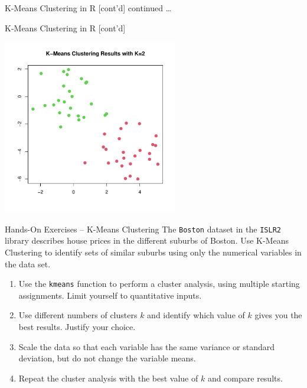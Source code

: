 \documentclass[ignorenonframetext,xcolor=x11names]{beamer}
\begin{document}
\begin{frame}[fragile]{K-Means Clustering in R \small [cont'd]}
continued \ldots
{}
\end{frame}

\begin{frame}{K-Means Clustering in R \small [cont'd]}
\centering

\includegraphics[height=3in]{kmeans.pdf}
\end{frame}

\begin{frame}{Hands-On Exercises -- K-Means Clustering}
The \texttt{Boston} dataset in the \texttt{ISLR2} library describes house prices in the different suburbs of Boston. Use K-Means Clustering to identify sets of similar suburbs using only the numerical variables in the data set.
\begin{enumerate}
   \item Use the \texttt{kmeans} function to perform a cluster analysis, using multiple starting assignments. Limit yourself to quantitative inputs.
   \item Use different numbers of clusters $k$ and identify which value of $k$ gives you the best results. Justify your choice.
   \item Scale the data so that each variable has the same variance or standard deviation, but do not change the variable means. 
   \item Repeat the cluster analysis with the best value of $k$ and compare results.\end{enumerate}
\end{frame}
\end{document}
